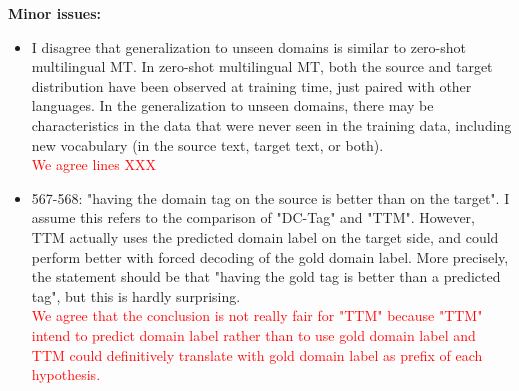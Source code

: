 \documentclass[12pt,times,a4paper,twoside]{article}
\newcommand{\fyTodo}[1]{\Todo[FY:]{\textcolor{orange}{#1}}}
\theoremstyle{definition}
\begin{document}
\noindent\textbf{Minor issues:}
\begin{itemize}
\item I disagree that generalization to unseen domains is similar to zero-shot multilingual MT. In zero-shot multilingual MT, both the source and target distribution have been observed at training time, just paired with other languages. In the generalization to unseen domains, there may be characteristics in the data that were never seen in the training data, including new vocabulary (in the source text, target text, or both).
  \\
  \textcolor{red}{We agree lines XXX}
\item 567-568: "having the domain tag on the source is better than on the target". I assume this refers to the comparison of "DC-Tag" and "TTM". However, TTM actually uses the predicted domain label on the target side, and could perform better with forced decoding of the gold domain label. More precisely, the statement should be that "having the gold tag is better than a predicted tag", but this is hardly surprising.
  \\
  \textcolor{red}{We agree that the conclusion is not really fair for "TTM" because "TTM" intend to predict domain label rather than to use gold domain label and TTM could definitively translate with gold domain label as prefix of each hypothesis.}
    \fyTodo{Check prediction quality, moderate conclusion}
\end{itemize}
\end{document}
